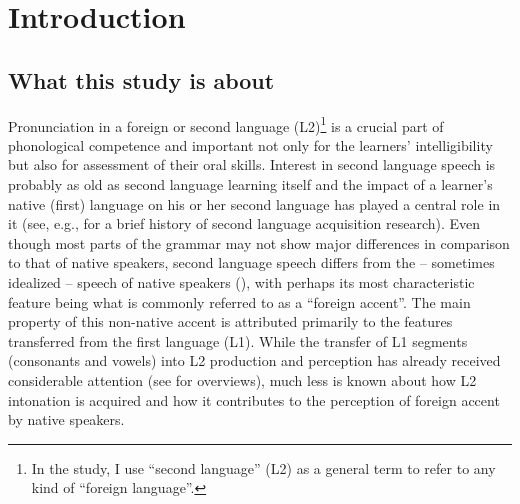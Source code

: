 
\chapter{Introduction}\label{ch:1}
\section{What this study is about}\label{sec:1.1} %

Pronunciation in a foreign or second language (L2)\footnote{In the study, I use ``second language'' (L2) as a general term to refer to any kind of ``foreign language''.} is a crucial part of phonological competence and important not only for the learners’ intelligibility but also for assessment of their oral skills. Interest in second language speech is probably as old as second language learning itself and the impact of a learner’s native (first) language on his or her second language has played a central role in it (see, e.g., \citealt{Thomas2013} for a brief history of second language acquisition research). Even though most parts of the grammar may not show major differences in comparison to that of native speakers, second language speech differs from the -- sometimes idealized -- speech of native speakers (\citealt[1]{ColantoniEtAl2015}), with perhaps its most characteristic feature being what is commonly referred to as a “foreign accent”. The main property of this non-native accent is attributed primarily to the features transferred from the first language (L1). While the transfer of L1 segments (consonants and vowels) into L2 production and perception has already received considerable attention (see \citealt{ColantoniEtAl2015, DerwingMunro2015} for overviews), much less is known about how L2 intonation is acquired and how it contributes to the perception of foreign accent by native speakers.


